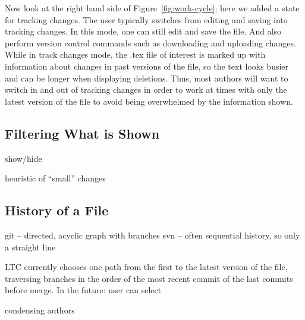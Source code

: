 Now look at the right hand side of Figure~\ref{fig:work-cycle}; here we added a state for tracking changes.  The user typically switches from editing and saving into tracking changes.  In this mode, one can still edit and save the file.  And also perform version control commands such as downloading and uploading changes.  While in track changes mode, the .tex file of interest is marked up with information about changes in past versions of the file, so the text looks busier and can be longer when displaying deletions.  Thus, most authors will want to switch in and out of tracking changes in order to work at times with only the latest version of the file to avoid being overwhelmed by the information shown.

\subsection{Filtering What is Shown}

show/hide

heuristic of ``small'' changes

\subsection{History of a File}

git -- directed, acyclic graph with branches
svn -- often sequential history, so only a straight line

LTC currently chooses one path from the first to the latest version of the file, traversing branches in the order of the most recent commit of the last commits before merge.  In the future: user can select

condensing authors


